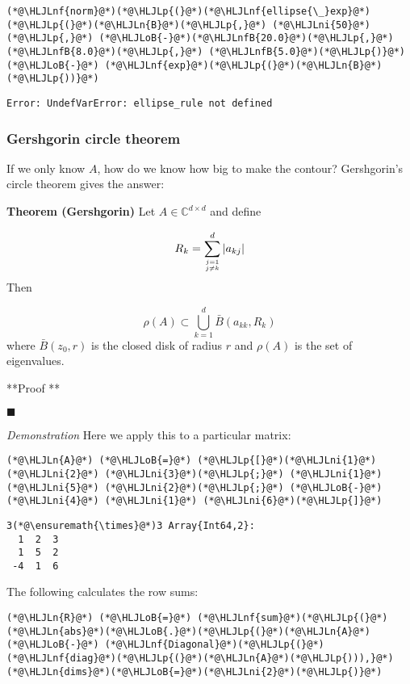 \documentclass[12pt,a4paper]{article}
\newcommand{\HLJLn}[1]{#1}
\newcommand{\HLJLnf}[1]{\textcolor[RGB]{66,102,213}{#1}}
\newcommand{\HLJLnfB}[1]{\textcolor[RGB]{59,151,46}{#1}}
\newcommand{\HLJLni}[1]{\textcolor[RGB]{59,151,46}{#1}}
\newcommand{\HLJLoB}[1]{\textcolor[RGB]{102,102,102}{\textbf{#1}}}
\newcommand{\HLJLp}[1]{#1}
\begin{document}
\begin{lstlisting}
(*@\HLJLnf{norm}@*)(*@\HLJLp{(}@*)(*@\HLJLnf{ellipse{\_}exp}@*)(*@\HLJLp{(}@*)(*@\HLJLn{B}@*)(*@\HLJLp{,}@*) (*@\HLJLni{50}@*)(*@\HLJLp{,}@*) (*@\HLJLoB{-}@*)(*@\HLJLnfB{20.0}@*)(*@\HLJLp{,}@*) (*@\HLJLnfB{8.0}@*)(*@\HLJLp{,}@*) (*@\HLJLnfB{5.0}@*)(*@\HLJLp{)}@*) (*@\HLJLoB{-}@*) (*@\HLJLnf{exp}@*)(*@\HLJLp{(}@*)(*@\HLJLn{B}@*)(*@\HLJLp{))}@*)
\end{lstlisting}

\begin{lstlisting}
Error: UndefVarError: ellipse_rule not defined
\end{lstlisting}


\subsubsection{Gershgorin circle theorem}
If we only know $A$, how do we know how big to make the contour? Gershgorin's circle theorem gives the answer:

\textbf{Theorem (Gershgorin)} Let $A \in {\mathbb C}^{d \times d}$ and define 

\[
R_k = \sum_{j=1 \atop j \neq k}^d |a_{kj}| 
\]
Then 

\[
\rho(A) \subset \bigcup_{k=1}^d \bar B(a_{kk}, R_k)
\]
where $\bar B(z_0, r)$ is the closed disk of radius $r$ and $\rho(A)$ is the set of eigenvalues.

**Proof **

\ensuremath{\blacksquare}

\emph{Demonstration} Here we apply this to a particular matrix:


\begin{lstlisting}
(*@\HLJLn{A}@*) (*@\HLJLoB{=}@*) (*@\HLJLp{[}@*)(*@\HLJLni{1}@*) (*@\HLJLni{2}@*) (*@\HLJLni{3}@*)(*@\HLJLp{;}@*) (*@\HLJLni{1}@*) (*@\HLJLni{5}@*) (*@\HLJLni{2}@*)(*@\HLJLp{;}@*) (*@\HLJLoB{-}@*)(*@\HLJLni{4}@*) (*@\HLJLni{1}@*) (*@\HLJLni{6}@*)(*@\HLJLp{]}@*)
\end{lstlisting}

\begin{lstlisting}
3(*@\ensuremath{\times}@*)3 Array{Int64,2}:
  1  2  3
  1  5  2
 -4  1  6
\end{lstlisting}


The following calculates the row sums:


\begin{lstlisting}
(*@\HLJLn{R}@*) (*@\HLJLoB{=}@*) (*@\HLJLnf{sum}@*)(*@\HLJLp{(}@*)(*@\HLJLn{abs}@*)(*@\HLJLoB{.}@*)(*@\HLJLp{(}@*)(*@\HLJLn{A}@*) (*@\HLJLoB{-}@*) (*@\HLJLnf{Diagonal}@*)(*@\HLJLp{(}@*)(*@\HLJLnf{diag}@*)(*@\HLJLp{(}@*)(*@\HLJLn{A}@*)(*@\HLJLp{))),}@*)(*@\HLJLn{dims}@*)(*@\HLJLoB{=}@*)(*@\HLJLni{2}@*)(*@\HLJLp{)}@*)
\end{lstlisting}
\end{document}
